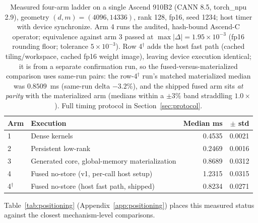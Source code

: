 \begin{table}[t]
\centering
\caption{Measured four-arm ladder on a single Ascend 910B2 (CANN 8.5,
torch\_npu 2.9), geometry $(d,m)=(4096,14336)$, rank 128, fp16, seed 1234;
host timer with device synchronize. Arm 4 runs the audited, hash-bound
Ascend-C operator; equivalence against arm 3 passed at $\max|\Delta|=
1.95\times10^{-3}$ (fp16 rounding floor; tolerance $5\times10^{-3}$).
Row 4$^\dagger$ adds the host fast path (cached tiling/workspace, cached
fp16 weight image), leaving device execution identical; it is from a
separate confirmation run, so the fused-versus-materialized comparison
uses same-run pairs: the row-4$^\dagger$ run's matched materialized
median was $0.8509$~ms (same-run delta $-3.2\%$), and the shipped fused
arm sits \emph{at parity} with the materialized arm (medians within a
$\pm3\%$ band straddling $1.0\times$). Full timing protocol in
Section~\ref{sec:protocol}.}
\label{tab:fourarmmeasured}
\begin{tabular}{llrr}
\toprule
Arm & Execution & Median ms & $\pm$ std \\
\midrule
1 & Dense kernels & 0.4535 & 0.0021 \\
2 & Persistent low-rank & 0.2469 & 0.0016 \\
3 & Generated core, global-memory materialization & 0.8689 & 0.0312 \\
4 & Fused no-store (v1, per-call host setup) & 1.2315 & 0.0315 \\
4$^\dagger$ & Fused no-store (host fast path, shipped) & 0.8234 & 0.0271 \\
\bottomrule
\end{tabular}
\end{table}

Table~\ref{tab:positioning} (Appendix~\ref{app:positioning}) places this
measured status against the closest mechanism-level comparisons.
